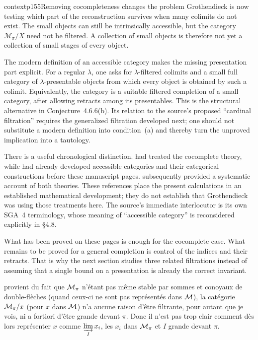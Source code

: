 
\begin{dcomment}{context}{p155}{Removing cocompleteness changes the problem}
Grothendieck is now testing which part of the reconstruction survives when many colimits do not exist. The small objects can still be intrinsically accessible, but the category $\mathcal M_\pi/X$ need not be filtered. A collection of small objects is therefore not yet a collection of small stages of every object.

The modern definition of an accessible category makes the missing presentation part explicit. For a regular $\lambda$, one asks for $\lambda$-filtered colimits and a small full category of $\lambda$-presentable objects from which every object is obtained by such a colimit. Equivalently, the category is a suitable filtered completion of a small category, after allowing retracts among its presentables. This is the structural alternative in Conjecture~4.6.6(b). Its relation to the source's proposed ``cardinal filtration'' requires the generalized filtration developed next; one should not substitute a modern definition into condition~(a) and thereby turn the unproved implication into a tautology.

There is a useful chronological distinction. \citet{GabrielUlmer1971} had treated the cocomplete theory, while \citet{MakkaiPare1989} had already developed accessible categories and their categorical constructions before these manuscript pages. \citet{AdamekRosicky1994} subsequently provided a systematic account of both theories. These references place the present calculations in an established mathematical development; they do not establish that Grothendieck was using those treatments here. The source's immediate interlocutor is its own SGA~4 terminology, whose meaning of ``accessible category'' is reconsidered explicitly in \S4.8.

What has been proved on these pages is enough for the cocomplete case. What remains to be proved for a general completion is control of the indices and their retracts. That is why the next section studies three related filtrations instead of assuming that a single bound on a presentation is already the correct invariant.
\end{dcomment}


provient du fait que $\mathcal{M}_{\pi}$ n'étant pas même stable par sommes et conoyaux de double-flèches (quand ceux-ci ne sont pas représentés dans $\mathcal{M}$), la catégorie $\mathcal{M}_{\pi}/x$ (pour $x$ dans $\mathcal{M}$) n'a aucune raison d'être filtrante, pour autant que je vois, ni a fortiori
d'être grande devant $\pi$. Donc il n'est pas trop clair comment dès lors représenter $x$ comme $\varinjlim\limits_{I} x_i$, les $x_i$ dans $\mathcal{M}_{\pi}$ et $I$ grande devant $\pi$.

